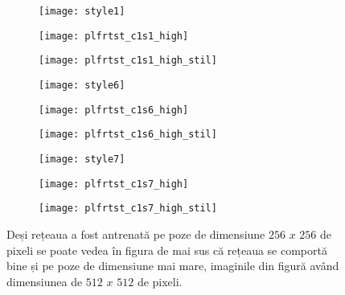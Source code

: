 \newpage
\begin{figure}[h]
	\centering
    \begin{subfigure}[b]{0.3\textwidth}
		\centering
        \texttt{[image: style1]}
        \label{fig:anaoas_style1}
	\end{subfigure}
    \hfill
    \begin{subfigure}[b]{0.3\textwidth}
		\centering
        \texttt{[image: plfrtst\_c1s1\_high]}
        \label{fig:plfrtst_c1s1_high}
	\end{subfigure}
    \hfill
    \begin{subfigure}[b]{0.3\textwidth}
		\centering
        \texttt{[image: plfrtst\_c1s1\_high\_stil]}
        \label{fig:plfrtst_c1s1_high_stil}
	\end{subfigure}
    \begin{subfigure}[b]{0.3\textwidth}
		\centering
        \texttt{[image: style6]}
        \label{fig:anaoas_style6}
	\end{subfigure}
    \hfill
    \begin{subfigure}[b]{0.3\textwidth}
		\centering
        \texttt{[image: plfrtst\_c1s6\_high]}
        \label{fig:plfrtst_c1s6_high}
	\end{subfigure}
    \hfill
    \begin{subfigure}[b]{0.3\textwidth}
		\centering
        \texttt{[image: plfrtst\_c1s6\_high\_stil]}
        \label{fig:plfrtst_c1s6_high_stil}
	\end{subfigure}
    \begin{subfigure}[b]{0.3\textwidth}
		\centering
        \texttt{[image: style7]}
        \label{fig:anaoas_style7}
	\end{subfigure}
    \hfill
    \begin{subfigure}[b]{0.3\textwidth}
		\centering
        \texttt{[image: plfrtst\_c1s7\_high]}
        \label{fig:plfrtst_c1s7_high}
	\end{subfigure}
    \hfill
    \begin{subfigure}[b]{0.3\textwidth}
		\centering
        \texttt{[image: plfrtst\_c1s7\_high\_stil]}
        \label{fig:plfrtst_c1s7_high_stil}
	\end{subfigure}
    \caption{Deși rețeaua a fost antrenată pe poze de dimensiune $256$ $x$ $256$ de pixeli se poate vedea în figura de mai sus că rețeaua se comportă bine și pe poze de dimensiune mai mare, imaginile din figură având dimensiunea de $512$ $x$ $512$ de pixeli.}
\end{figure}